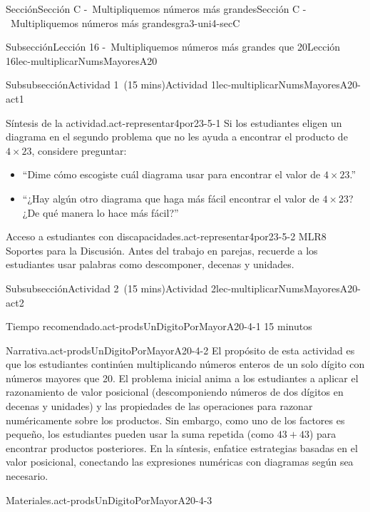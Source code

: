 \documentclass[oneside,10pt,]{article}
\begin{document}
\begin{sectionptx}{Sección}{Sección C -~Multipliquemos números más grandes}{}{Sección C -~Multipliquemos números más grandes}{}{}{gra3-uni4-secC}
\begin{subsectionptx}{Subsección}{Lección 16 -~Multipliquemos números más grandes que 20}{}{Lección 16}{}{}{lec-multiplicarNumsMayoresA20}
\begin{subsubsectionptx}{Subsubsección}{Actividad 1~(15 mins)}{}{Actividad 1}{}{}{lec-multiplicarNumsMayoresA20-act1}
\begin{paragraphs}{Síntesis de la actividad.}{act-representar4por23-5-1}
Si los estudiantes eligen un diagrama en el segundo problema que no les ayuda a encontrar el producto de \(4\times23\), considere preguntar:%
%
\begin{itemize}[label=\textbullet]
\item{}``Dime cómo escogiste cuál diagrama usar para encontrar el valor de \(4\times23\).''%
\item{}``¿Hay algún otro diagrama que haga más fácil encontrar el valor de \(4\times23\)? ¿De qué manera lo hace más fácil?''%
\end{itemize}
\end{paragraphs}%
\begin{paragraphs}{Acceso a estudiantes con discapacidades.}{act-representar4por23-5-2}%
MLR8 Soportes para la Discusión. Antes del trabajo en parejas, recuerde a los estudiantes usar palabras como descomponer, decenas y unidades.%
\end{paragraphs}%
\end{subsubsectionptx}
%
%
\typeout{************************************************}
\typeout{************************************************}
%
\begin{subsubsectionptx}{Subsubsección}{Actividad 2~(15 mins)}{}{Actividad 2}{}{}{lec-multiplicarNumsMayoresA20-act2}
\par
\begin{paragraphs}{Tiempo recomendado.}{act-prodsUnDigitoPorMayorA20-4-1}%
15 minutos%
\end{paragraphs}%
\begin{paragraphs}{Narrativa.}{act-prodsUnDigitoPorMayorA20-4-2}%
El propósito de esta actividad es que los estudiantes continúen multiplicando números enteros de un solo dígito con números mayores que 20. El problema inicial anima a los estudiantes a aplicar el razonamiento de valor posicional (descomponiendo números de dos dígitos en decenas y unidades) y las propiedades de las operaciones para razonar numéricamente sobre los productos. Sin embargo, como uno de los factores es pequeño, los estudiantes pueden usar la suma repetida (como \(43 + 43\)) para encontrar productos posteriores. En la síntesis, enfatice estrategias basadas en el valor posicional, conectando las expresiones numéricas con diagramas según sea necesario.%
\end{paragraphs}%
\begin{paragraphs}{Materiales.}{act-prodsUnDigitoPorMayorA20-4-3}%
%
\begin{itemize}[label=\textbullet]

\end{itemize}
\end{paragraphs}
\end{subsubsectionptx}
\end{subsectionptx}
\end{sectionptx}
\end{document}

